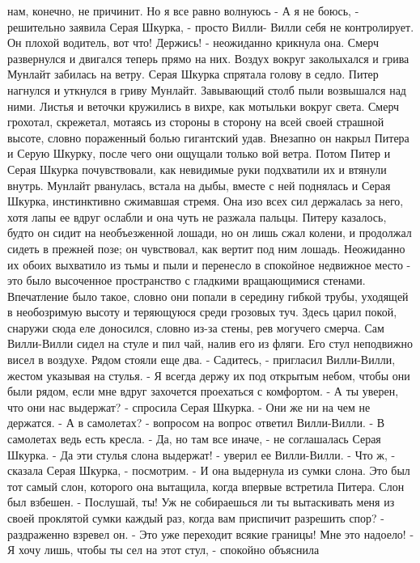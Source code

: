 нам, конечно, не причинит. Но я все равно волнуюсь
    - А я не боюсь, - решительно заявила Серая Шкурка, - просто Вилли-
Вилли себя не контролирует. Он плохой водитель, вот что! Держись! - 
неожиданно крикнула она.
    Смерч развернулся и двигался теперь прямо на них. Воздух вокруг 
заколыхался и грива Мунлайт забилась на ветру. Серая Шкурка спрятала 
голову в седло. Питер нагнулся и уткнулся в гриву Мунлайт.
    Завывающий столб пыли возвышался над ними. Листья и веточки 
кружились в вихре, как мотыльки вокруг света. Смерч грохотал, 
скрежетал, мотаясь из стороны в сторону на всей своей страшной высоте, 
словно пораженный болью гигантский удав. Внезапно он накрыл Питера и 
Серую Шкурку, после чего они ощущали только вой ветра.
    Потом Питер и Серая Шкурка почувствовали, как невидимые руки 
подхватили их и втянули внутрь. Мунлайт рванулась, встала на дыбы, 
вместе с ней поднялась и Серая Шкурка, инстинктивно сжимавшая стремя. 
Она изо всех сил держалась за него, хотя лапы ее вдруг ослабли и она 
чуть не разжала пальцы. Питеру казалось, будто он сидит на 
необъезженной лошади, но он лишь сжал колени, и продолжал сидеть в 
прежней позе; он чувствовал, как вертит под ним лошадь. Неожиданно их 
обоих выхватило из тьмы и пыли и перенесло в спокойное недвижное место 
- это было высоченное пространство с гладкими вращающимися стенами. 
Впечатление было такое, словно они попали в середину гибкой трубы, 
уходящей в необозримую высоту и теряющуюся среди грозовых туч. Здесь 
царил покой, снаружи сюда еле доносился, словно из-за стены, рев 
могучего смерча.
    Сам Вилли-Вилли сидел на стуле и пил чай, налив его из фляги. Его 
стул неподвижно висел в воздухе. Рядом стояли еще два.
    - Садитесь, - пригласил Вилли-Вилли, жестом указывая на стулья. - 
Я всегда держу их под открытым небом, чтобы они были рядом, если мне 
вдруг захочется проехаться с комфортом.
    - А ты уверен, что они нас выдержат? - спросила Серая Шкурка. - 
Они же ни на чем не держатся.
    - А в самолетах? - вопросом на вопрос ответил Вилли-Вилли. - В 
самолетах ведь есть кресла.
    - Да, но там все иначе, - не соглашалась Серая Шкурка.
    - Да эти стулья слона выдержат! - уверил ее Вилли-Вилли.
    - Что ж, - сказала Серая Шкурка, - посмотрим. - И она выдернула из 
сумки слона. Это был тот самый слон, которого она вытащила, когда 
впервые встретила Питера. Слон был взбешен.
    - Послушай, ты! Уж не собираешься ли ты вытаскивать меня из своей 
проклятой сумки каждый раз, когда вам приспичит разрешить спор? - 
раздраженно взревел он. - Это уже переходит всякие границы! Мне это 
надоело!
    - Я хочу лишь, чтобы ты сел на этот стул, - спокойно объяснила 
